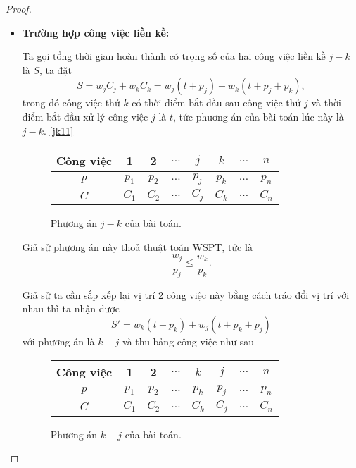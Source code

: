 \documentclass[12pt,a4paper]{report}
\begin{document}
\begin{proof}

\phantom{text}

\begin{itemize}
\item \textbf{Trường hợp công việc liền kề:}

	Ta gọi tổng thời gian hoàn thành có trọng số của hai công việc liền kề $j-k$ là $S$, ta đặt
	\begin{equation} \label{S}
		S = w_j C_j + w_k C_k = w_j(t+p_j) + w_k(t+p_j+p_k),
	\end{equation}
	trong đó công việc thứ $k$ có thời điểm bắt đầu sau công việc thứ $j$ và thời điểm bắt đầu xử lý công việc $j$ là $t$, tức phương án của bài toán lúc này là $j - k$. \eqref{jk11}
	
	\begin{figure}[h!]
		\centering
		 \begin{tabular}{|c | c c c c c c c |} 
		 \hline
		 Công việc & 1 & 2 & $\ldots$ & $j$ & $k$ & $\ldots$ & $n$ \\
		 \hline\hline
		 $p$ & $p_1$ & $p_2$ & $\ldots$ & $p_j$ & $p_k$ & $\ldots$ & $p_n$ \\
		 $C$ & $C_1$ & $C_2$ & $\ldots$ & $C_j$ & $C_k$ & $\ldots$ & $C_n$ \\
		 \hline
		 \end{tabular}
	\caption{\label{jk11}Phương án $j - k$ của bài toán.}
	\end{figure}
	
	Giả sử phương án này thoả thuật toán WSPT, tức là
	\begin{equation}
	\frac{w_j}{p_j} \leq \frac{w_k}{p_k}.
	\end{equation}
	
	Giả sử ta cần sắp xếp lại vị trí 2 công việc này bằng cách tráo đổi vị trí với nhau thì ta nhận được
	\begin{equation} \label{S'}
		S' = w_k(t+p_k) + w_j(t+p_k+p_j)
	\end{equation}
	với phương án là $k-j$ và thu bảng công việc như sau
	
	\begin{figure}[h!]
		\centering
		 \begin{tabular}{|c | c c c c c c c |} 
		 \hline
		 Công việc & 1 & 2 & $\ldots$ & $k$ & $j$ & $\ldots$ & $n$ \\
		 \hline\hline
		 $p$ & $p_1$ & $p_2$ & $\ldots$ & $p_k$ & $p_j$ & $\ldots$ & $p_n$ \\
		 $C$ & $C_1$ & $C_2$ & $\ldots$ & $C_k$ & $C_j$ & $\ldots$ & $C_n$ \\
		 \hline
		 \end{tabular}
	\caption{Phương án $k - j$ của bài toán.}
	\end{figure}


\end{itemize}
\end{proof}
\end{document}
